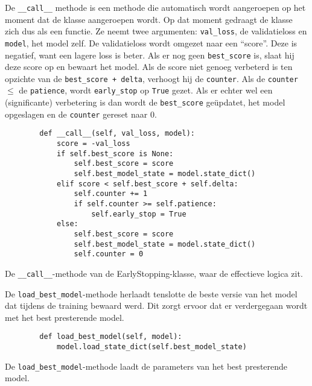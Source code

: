De \texttt{\_\_call\_\_} methode is een methode die automatisch wordt aangeroepen op het moment dat de klasse aangeroepen wordt. Op dat moment gedraagt de klasse zich dus als een functie. Ze neemt twee argumenten: \texttt{val\_loss}, de validatieloss en \texttt{model}, het model zelf. De validatieloss wordt omgezet naar een ``score''. Deze is negatief, want een lagere loss is beter. Als er nog geen \texttt{best\_score} is, slaat hij deze score op en bewaart het model. Als de score niet genoeg verbeterd is ten opzichte van de \texttt{best\_score + delta}, verhoogt hij de \texttt{counter}. Als de \texttt{counter} $\leq$ de \texttt{patience}, wordt \texttt{early\_stop} op \texttt{True} gezet. Als er echter wel een (significante) verbetering is dan wordt de \texttt{best\_score} geüpdatet, het model opgeslagen en de \texttt{counter} gereset naar 0.

\begin{listing}[H]
    \begin{verbatim}
        def __call__(self, val_loss, model):
            score = -val_loss
            if self.best_score is None:
                self.best_score = score
                self.best_model_state = model.state_dict()
            elif score < self.best_score + self.delta:
                self.counter += 1
                if self.counter >= self.patience:
                    self.early_stop = True
            else:
                self.best_score = score
                self.best_model_state = model.state_dict()
                self.counter = 0
    \end{verbatim}
    \caption[\texttt{\_\_call\_\_}-methode van de EarlyStopping-klasse]{De \texttt{\_\_call\_\_}-methode van de EarlyStopping-klasse, waar de effectieve logica zit.}
\end{listing}

De \texttt{load\_best\_model}-methode herlaadt tenslotte de beste versie van het model dat tijdens de training bewaard werd. Dit zorgt ervoor dat er verdergegaan wordt met het best presterende model. 

\begin{listing}[H]
    \begin{verbatim}
        def load_best_model(self, model):
            model.load_state_dict(self.best_model_state)
    \end{verbatim}
    \caption[\texttt{load\_best\_model}-methode van de EarlyStopping-klasse]{De \texttt{load\_best\_model}-methode laadt de parameters van het best presterende model.}
\end{listing}

